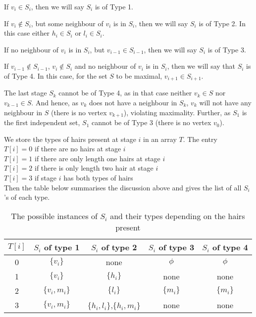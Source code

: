 \documentclass[10pt]{article}
\begin{document}
 If $v_i \in S_i$, then we will say $S_i$ is of Type 1.

 If $v_i\not\in S_i$, but some neighbour of $v_i$ is in
$S_i$, then we will say $S_i$ is of Type 2. In this case either $h_i \in
S_i$ or $l_i \in S_i$.

 If no neighbour of $v_i$ is in $S_i$, but $v_{i-1}\in
S_{i-1}$, then we will say $S_i$ is of Type 3. 

 If $v_{i-1}\not\in S_{i-1}$, $v_i\not\in S_i$ and no
neighbour of $v_i$ is in $S_i$, then we will say that $S_i$ is of Type 4.
In this case, for the set $S$ to be maximal, $v_{i+1}\in S_{i+1}$.


The last stage $S_k$ cannot be of Type 4, as in that case neither $v_k\in
S$ nor $v_{k-1}\in S$. And hence, as $v_k$ does not have a neighbour in
$S_k$, $v_k$ will not have any neighbour in $S$ (there is no vertex
$v_{k+1}$), violating maximality. Further, as $S_1$ is the first
independent set, $S_1$ cannot be of Type 3 (there is no vertex $v_0$).

We store the types of hairs present at stage $i$ in an array $T$.  The
entry \\
$T[i]= 0$  if there are no hairs at stage  $i$\\
$T[i]=	1$ if there are only length one hairs at stage $i$\\
$T[i]=	2$ if there is only length two hair at stage  $i$\\
$T[i]=	3$ if stage  $i$  has both types of hairs \\

Then the table below summarises the discussion above and gives the list
of all $S_i$'s of each type.
\begin{table}[h!]
\centering
\begin{tabular}{|c||c|c|c|c|}
  \hline
  $T[i]$ 	& $S_i$ of type 1 	& $S_i$  of type 2  &$S_i$ of type 3 &$S_i$ of type 4\\
  \hline \hline	
  0  	 	& $\{v_i\}$ 		&none			  	& $\phi$  		& $\phi$  \\
  \hline
  1  	 	& $\{v_i\}$ 		& $\{h_i\}$		  	& none 			& none  \\
  \hline
  2  	 	& $\{v_i,m_i\}$ 	& $\{l_i\}$		  	& $\{m_i\}$  		& $\{m_i\}$  \\
  \hline
  3  	 	& $\{v_i,m_i\}$ 	& $\{h_i,l_i\}$,$\{h_i,m_i\}$  	& none  		& none  \\
  \hline
\end{tabular}
\caption{The possible instances of $S_i$ and their types depending on the hairs present}
\end{table}
\end{document}
